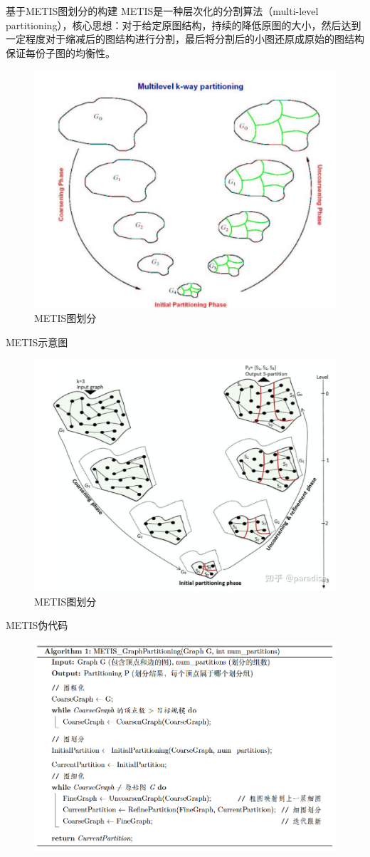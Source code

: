 \documentclass[UTF8, aspectratio=169,10pt]{beamer}%
\numberwithin{equation}{section}
\numberwithin{figure}{section}
\numberwithin{table}{section}
\def\kongbai{\usebackgroundtemplate{}}
\theoremstyle{definition}
\begin{document}
\begin{frame}{基于METIS图划分的构建}
	METIS是一种层次化的分割算法（multi-level partitioning），核心思想：对于给定原图结构，持续的降低原图的大小，然后达到一定程度对于缩减后的图结构进行分割，最后将分割后的小图还原成原始的图结构保证每份子图的均衡性。
	\begin{figure}[htpb]
		\centering
		\includegraphics[width=0.4\linewidth]{pic1/a2}
		\caption{METIS图划分}
		\label{fig:4aa}
	\end{figure}
\end{frame}


\begin{frame}{METIS示意图}
	\begin{figure}[htpb]
		\centering
		\includegraphics[width=0.6\linewidth]{pic1/a3}
		\caption{METIS图划分}
		\label{fig:4aaa}
	\end{figure}
	
\end{frame}

{
	\kongbai

\begin{frame}{METIS伪代码}
	\begin{figure}[htpb]
		\centering
		\includegraphics[width=0.7\linewidth]{pic1/a4}
		
		\label{fig:4aawa}
	\end{figure}
\end{frame}



}
\end{document}
